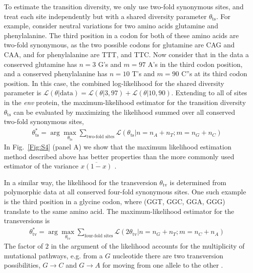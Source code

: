 \documentclass[11pt]{article}
\newcommand{\ts}{{\text{ts}}}
\newcommand{\tv}{{\text{tv}}}
\renewcommand{\L}{{\mathcal{L}}}
\begin{document}
To estimate the transition diversity, we only use  two-fold synonymous sites, and treat each site  independently but with a shared diversity parameter $\theta_{\ts}$.
For example, consider neutral variations for two amino acids glutamine and phenylalanine.  The third position in a codon for  both of these amino acids are two-fold synonymous, as the two possible codons for glutamine are CAG and CAA, and for phenylalanine are TTT, and TTC. Now consider that in the data a conserved glutamine has $n = 3$  G's and $m = 97$  A's in the third codon position, and a conserved phenylalanine has  $n=10$ T's and $m=90$ C''s at its  third codon position. In this case, the combined log-likelihood for the shared diversity parameter is $\L(\theta|\text{data}) = \L(\theta|3,97) + \L(\theta|10,90)$. Extending to all of sites in the {\it env} protein, the maximum-likelihood estimator for the transition diversity $\theta_{\ts}$ can be evaluated by maximizing the likelihood summed over all conserved two-fold synonymous sites, 
{\small
\begin{align}
\theta^*_{\ts} = \arg \max_{\theta_{\ts}} \sum_\text{two-fold sites} \L(\theta_{\ts}|n = n_A +n_T ; m =  n_G + n_C)
\end{align}} 
In Fig.~\ref{Fig:S4} (panel A) we show that the maximum likelihood estimation method described above has better properties than the more commonly used estimator of the variance $\overline{x(1-x)}$  \cite{stoddartGenotypicDiversityEstimation1988}.



In a similar way, the likelihood for the transversion $\theta_{\tv}$ is determined from polymorphic data at all conserved four-fold synonymous sites. One such example is the third position in a glycine codon, where (GGT, GGC, GGA, GGG) translate to the same amino acid. The maximum-likelihood estimator for the transversions is
{\small
\begin{align}
\theta^*_{\tv} = \arg \max_{\theta_{\tv}} \sum_\text{four-fold sites} \L(2\theta_{\tv}|n = n_G +n_T ; m =  n_C + n_A)
\end{align}}
The factor of $2$ in the argument of the likelihood accounts for the multiplicity of mutational pathways, e.g. from a $G$ nucleotide there are two transversion possibilities, $G\rightarrow C$ and $G\rightarrow A$ for  moving from one allele to the other \cite{kimuraEstimationEvolutionaryDistances1981}.
\end{document}

